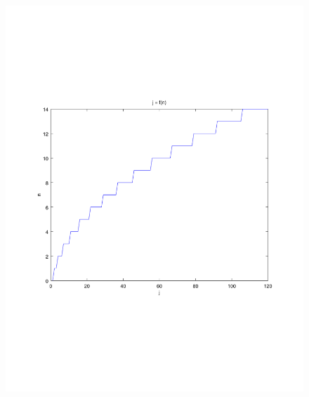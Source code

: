 \documentclass[a4paper]{article}
\begin{document}
\begin{figure}
	\includegraphics[width=\textwidth]{J_n.pdf}
	\caption{}
\end{figure}




\end{document}
